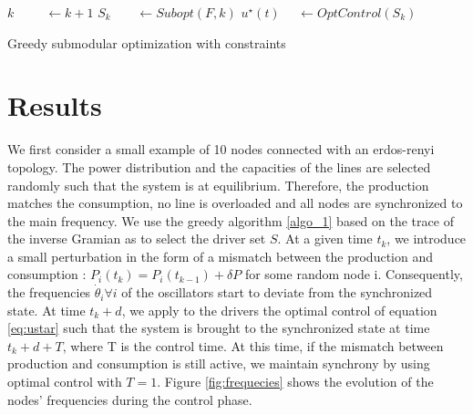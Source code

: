 \documentclass[conference]{IEEEtran}
\begin{document}
\begin{algorithm}
        \begin{algorithmic}
    \State $k\ \ \ \ \ \ \ \ \ \ \ \gets k+1$
    \State $ S_k \ \ \ \ \ \ \ \ \ \gets Subopt(F, k)$
    \State $ u^{\star}(t)\ \ \ \ \ \ \gets OptControl( S_{k} )$ 
\EndWhile
        \end{algorithmic}
        \caption{Greedy submodular optimization with constraints}
        \label{algo_1}
\end{algorithm}
\normalsize



\section{Results}
\label{sec:Results}

We first consider a small example of 10 nodes connected with an erdos-renyi topology. The power distribution and the capacities of the lines are selected randomly such that the system is at equilibrium. Therefore, the production matches the consumption, no line is overloaded and all nodes are synchronized to the main frequency. We use the greedy algorithm \ref{algo_1} based on the trace of the inverse Gramian as to select the driver set $S$. At a given time $ t_k $, we introduce a small perturbation in the form of a mismatch between the production and consumption : $P_i(t_k) = P_i(t_{k-1}) + \delta P$ for some random node i. Consequently, the frequencies $ \dot{ \theta }_i \forall i $ of the oscillators start to deviate from the synchronized state. At time $ t_k + d $, we apply to the drivers the optimal control of equation \ref{eq:ustar} such that the system is brought to the synchronized state at time $ t_k + d + T $, where T is the control time. At this time, if the mismatch between production and consumption is still active, we maintain synchrony by using optimal control with $T=1$. Figure \ref{fig:frequecies} shows the evolution of the nodes' frequencies during the control phase.
\end{document}
